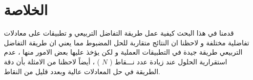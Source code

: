 \chapter*{الخلاصة  }
\noindent
قدمنا في هذا البحث كيفية عمل طريقة التفاضل التربيعي و تطبيقات على معادلات تفاضلية مختلفة و لاحظنا ان النتائج متقاربة للحل المضبوط مما يعني ان طريقة التفاضل التربيعي طريقة جيدة في التطبيقات العملية و لكن يؤخذ عليها بعض الامور منها ، عدم استقرارية الحلول عند زيادة عدد نـــقاط ( $N$ ) ، أيضاً لاحظنا من الامثلة بأن دقة الطريقة في حل المعادلات عالية وبعدد قليل من النقاط.